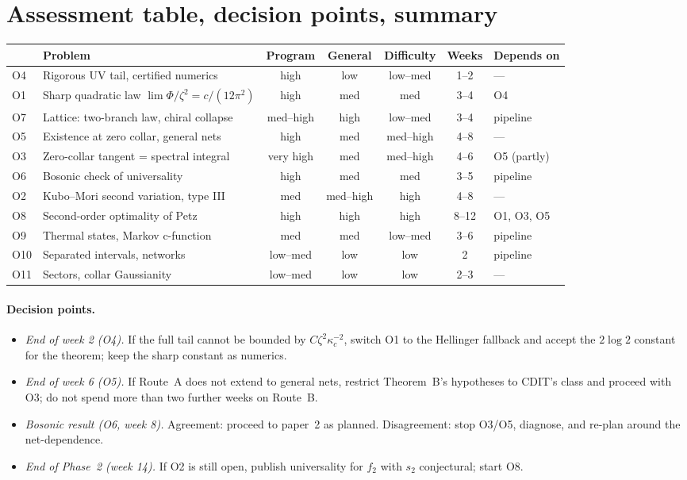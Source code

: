 \documentclass[11pt]{article}
\theoremstyle{accent}
\theoremstyle{definition}
\begin{document}
\section{Assessment table, decision points, summary}\label{sec:ranking}

\begin{small}
\begin{tabular}{@{}l p{} c c c c l@{}}
\toprule
 & Problem & Program & General & Difficulty & Weeks & Depends on \\
\midrule
O4 & Rigorous UV tail, certified numerics & high & low & low--med & 1--2 & --- \\
O1 & Sharp quadratic law \(\lim\Phi/\zeta^2=c/(12\pi^2)\) & high & med & med & 3--4 & O4 \\
O7 & Lattice: two-branch law, chiral collapse & med--high & high & low--med & 3--4 & pipeline \\
O5 & Existence at zero collar, general nets & high & med & med--high & 4--8 & --- \\
O3 & Zero-collar tangent = spectral integral & very high & med & med--high & 4--6 & O5 (partly) \\
O6 & Bosonic check of universality & high & med & med & 3--5 & pipeline \\
O2 & Kubo--Mori second variation, type III & med & med--high & high & 4--8 & --- \\
O8 & Second-order optimality of Petz & high & high & high & 8--12 & O1, O3, O5 \\
O9 & Thermal states, Markov c-function & med & med & low--med & 3--6 & pipeline \\
O10 & Separated intervals, networks & low--med & low & low & 2 & pipeline \\
O11 & Sectors, collar Gaussianity & low--med & low & low & 2--3 & --- \\
\bottomrule
\end{tabular}
\end{small}

\paragraph{Decision points.}
\begin{itemize}[leftmargin=1.6em,itemsep=1pt]
\item \emph{End of week 2 (O4).} If the full tail cannot be bounded by \(C\zeta^2\kappa_c^{-2}\), switch O1 to the Hellinger fallback and accept the \(2\log2\) constant for the theorem; keep the sharp constant as numerics.
\item \emph{End of week 6 (O5).} If Route~A does not extend to general nets, restrict Theorem~B's hypotheses to CDIT's class and proceed with O3; do not spend more than two further weeks on Route~B.
\item \emph{Bosonic result (O6, week 8).} Agreement: proceed to paper~2 as planned.  Disagreement: stop O3/O5, diagnose, and re-plan around the net-dependence.
\item \emph{End of Phase~2 (week 14).} If O2 is still open, publish universality for \(f_2\) with \(s_2\) conjectural; start O8.
\end{itemize}
\end{document}

